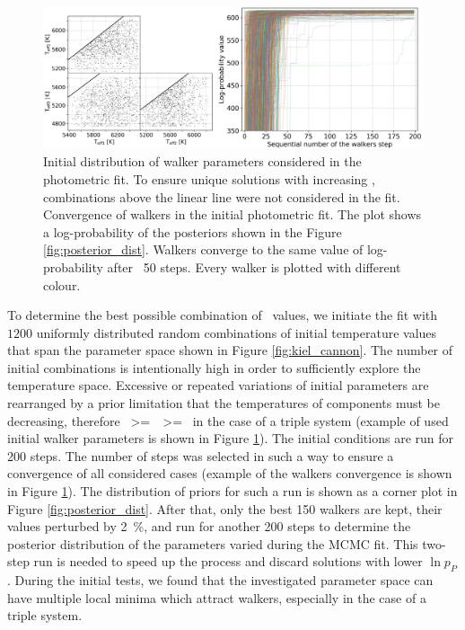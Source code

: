 \begin{figure}
	\centering
	\includegraphics[width=\textwidth]{150408004101169_p1884_init_3_walkers_comb.png}
	\caption{Initial distribution of walker parameters considered in the photometric fit. To ensure unique solutions with increasing \Teff, combinations above the linear line were not considered in the fit. Convergence of walkers in the initial photometric fit. The plot shows a log-probability of the posteriors shown in the Figure \ref{fig:posterior_dist}. Walkers converge to the same value of log-probability after ~50 steps. Every walker is plotted with different colour.}
	\label{fig:teff_initial_walkers}
\end{figure}

To determine the best possible combination of \Teff\ values, we initiate the fit with $1200$ uniformly distributed random combinations of initial temperature values that span the parameter space shown in Figure \ref{fig:kiel_cannon}. The number of initial combinations is intentionally high in order to sufficiently explore the temperature space. Excessive or repeated variations of initial parameters are rearranged by a prior limitation that the temperatures of components must be decreasing, therefore ~>=~~>=~ in the case of a triple system (example of used initial walker parameters is shown in Figure \ref{fig:teff_initial_walkers}). The initial conditions are run for 200 steps. The number of steps was selected in such a way to ensure a convergence of all considered cases (example of the walkers convergence is shown in Figure \ref{fig:teff_initial_walkers}). The distribution of priors for such a run is shown as a corner plot in Figure \ref{fig:posterior_dist}. After that, only the best 150 walkers are kept, their values perturbed by 2~\%, and run for another 200 steps to determine the posterior distribution of the parameters varied during the MCMC fit. This two-step run is needed to speed up the process and discard solutions with lower $\ln p_{P}$. During the initial tests, we found that the investigated parameter space can have multiple local minima which attract walkers, especially in the case of a triple system.

